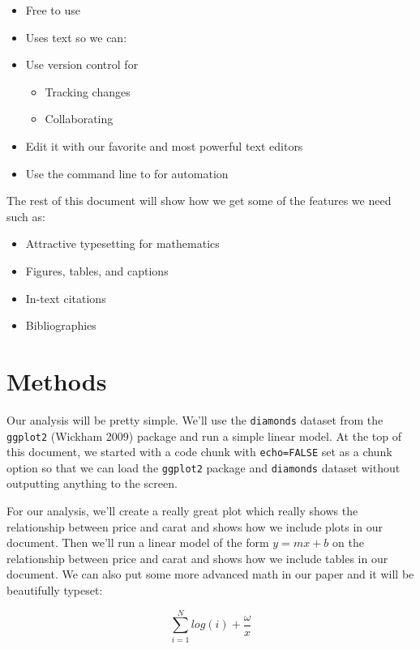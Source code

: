 \documentclass[]{article}
\providecommand{\tightlist}{%
  \setlength{\itemsep}{0pt}\setlength{\parskip}{0pt}}
\begin{document}
\begin{itemize}
\tightlist
\item
  Free to use
\item
  Uses text so we can:
\item
  Use version control for

  \begin{itemize}
  \tightlist
  \item
    Tracking changes
  \item
    Collaborating
  \end{itemize}
\item
  Edit it with our favorite and most powerful text editors
\item
  Use the command line to for automation
\end{itemize}

The rest of this document will show how we get some of the features we
need such as:

\begin{itemize}
\tightlist
\item
  Attractive typesetting for mathematics
\item
  Figures, tables, and captions
\item
  In-text citations
\item
  Bibliographies
\end{itemize}

\section{Methods}\label{methods}

Our analysis will be pretty simple. We'll use the \texttt{diamonds}
dataset from the \texttt{ggplot2} (Wickham 2009) package and run a
simple linear model. At the top of this document, we started with a code
chunk with \texttt{echo=FALSE} set as a chunk option so that we can load
the \texttt{ggplot2} package and \texttt{diamonds} dataset without
outputting anything to the screen.

For our analysis, we'll create a really great plot which really shows
the relationship between price and carat and shows how we include plots
in our document. Then we'll run a linear model of the form
\(y = mx + b\) on the relationship between price and carat and shows how
we include tables in our document. We can also put some more advanced
math in our paper and it will be beautifully typeset:

\[\sum_{i=1}^{N}{log(i) + \frac{\omega}{x}}\]
\end{document}
